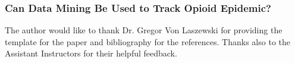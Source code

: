 \documentclass[sigconf]{acmart}
\begin{document}
\subsubsection{Can Data Mining Be Used to Track Opioid Epidemic?}




\begin{acks}

  The author would like to thank Dr. Gregor Von Laszewski for providing the 
  \LaTex template for the paper and \JabRef bibliography for the references. 
  Thanks also to the Assistant Instructors for their helpful feedback.

\end{acks}


 
\end{document}

